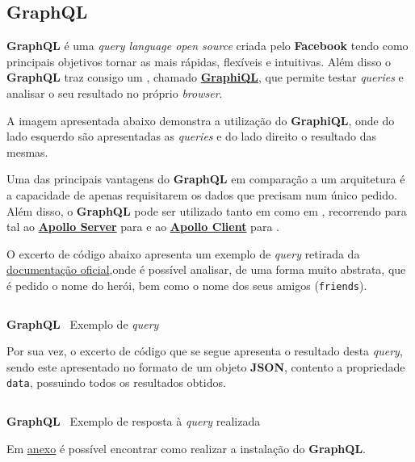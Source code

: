\subsection{GraphQL}

\begin{minipage}[t]{.3\textwidth}
\end{minipage}
\begin{minipage}[t]{.7\textwidth}
	\minipagerestore
	\textbf{GraphQL} é uma \textit{query language open source} criada pelo \textbf{Facebook} tendo como principais objetivos tornar as  mais rápidas, flexíveis e intuitivas. Além disso o \textbf{GraphQL} traz consigo um , chamado \textbf{\href{https://github.com/graphql/graphiql}{GraphiQL}}, que permite testar \textit{queries} e analisar o seu resultado no próprio \textit{browser}.

	A imagem apresentada abaixo demonstra a utilização do \textbf{GraphiQL}, onde do lado esquerdo são apresentadas as \textit{queries} e do lado direito o resultado das mesmas.
\end{minipage}


Uma das principais vantagens do \textbf{GraphQL} em comparação a um arquitetura  é a capacidade de apenas requisitarem os dados que precisam num único pedido. Além disso, o \textbf{GraphQL} pode ser utilizado tanto em  como em , recorrendo para tal ao \href{https://www.apollographql.com/docs/apollo-server/}{\textbf{Apollo Server}} para  e ao \textbf{\href{https://www.apollographql.com/docs/react/}{Apollo Client}} para .

O excerto de código abaixo apresenta um exemplo de \textit{query} retirada da \href{https://graphql.org/learn/queries/}{documentação oficial},onde é possível analisar, de uma forma muito abstrata, que é pedido o nome do herói, bem como o nome dos seus amigos (\texttt{friends}).

\begin{longlisting}
	\inputminted{text}{code/graphql/example-query.graphql}
	\caption{\textbf{GraphQL} \textemdash~Exemplo de \textit{query}}
\end{longlisting}

Por sua vez, o excerto de código que se segue apresenta o resultado desta \textit{query}, sendo este apresentado no formato de um objeto \textbf{JSON}, contento a propriedade \texttt{data}, possuindo todos os resultados obtidos.

\begin{longlisting}
	\inputminted{json}{code/graphql/example-result.json}
	\caption{\textbf{GraphQL} \textemdash~Exemplo de resposta à \textit{query} realizada}
\end{longlisting}

Em \underline{\hyperref[graphqlAttachments]{anexo}} é possível encontrar como realizar a instalação do \textbf{GraphQL}.